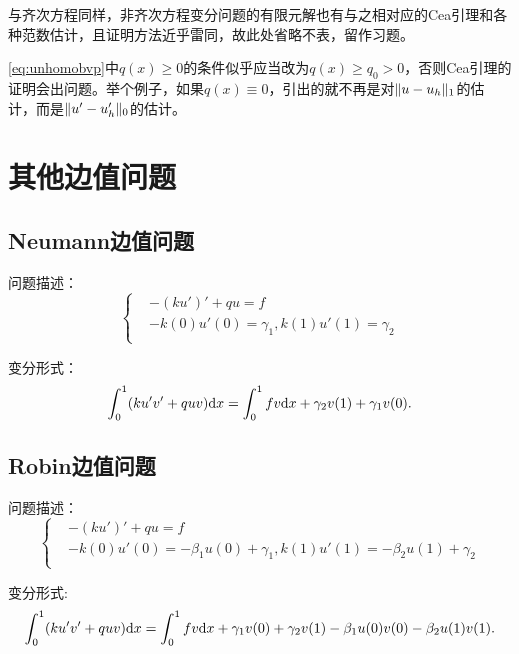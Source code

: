 与齐次方程同样，非齐次方程变分问题的有限元解也有与之相对应的Cea引理和各种范数估计，且证明方法近乎雷同，故此处省略不表，留作习题。

\begin{remark}
  \eqref{eq:unhomobvp}中$q(x)\ge 0$的条件似乎应当改为$q(x)\ge q_{0}>0$，否则Cea引理的证明会出问题。举个例子，如果$q(x)\equiv 0$，引出的就不再是对$\|u-u_{h}\|_{1}$的估计，而是$\|u'-u_{h}'\|_{0}$的估计。
\end{remark}
\section{其他边值问题}
\subsection{Neumann边值问题}
问题描述：
\begin{equation}
  \label{eq:Neumann}
  \left\{
    \begin{aligned}
    &-(ku')'+qu=f\\
    &-k(0)u'(0)=\gamma_{1},k(1)u'(1)=\gamma_{2}\\
    \end{aligned}
  \right.
\end{equation}

变分形式：
\begin{equation}
  \int_{0}^{1}(ku'v'+quv)\mathrm{d} x=\int_{0}^{1}fv\mathrm{d} x+\gamma_{2}v(1)+\gamma_{1}v(0).
\end{equation}
\subsection{Robin边值问题}
问题描述：
\begin{equation}
  \label{eq:Robin}
  \left\{
    \begin{aligned}
    &-(ku')'+qu=f\\
    &-k(0)u'(0)=-\beta_{1}u(0)+\gamma_{1},k(1)u'(1)=-\beta_{2}u(1)+\gamma_{2}\\
    \end{aligned}
  \right.
\end{equation}

变分形式:
\begin{equation}
  \int_{0}^{1}(ku'v'+quv)\mathrm{d} x=\int_{0}^{1}fv\mathrm{d} x+\gamma_{1}v(0)+\gamma_{2}v(1)-\beta_{1}u(0)v(0)-\beta_{2}u(1)v(1).
\end{equation}

